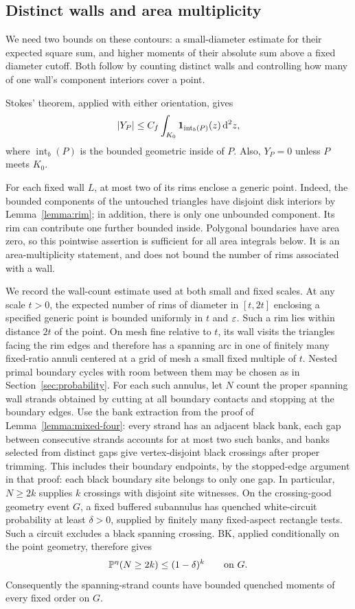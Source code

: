 \subsection{Distinct walls and area multiplicity}

We need two bounds on these contours: a small-diameter estimate for
their expected square sum, and higher moments of their absolute sum
above a fixed diameter cutoff. Both follow by counting distinct walls
and controlling how many of one wall's component interiors cover a point.

Stokes' theorem, applied with either orientation, gives
\begin{equation}
 |Y_P|\le C_f\int_{K_0}\mathbf 1_{\operatorname{int}_b(P)}(z)\,\mathrm d^2z,
 \label{energy:stokes}
\end{equation}
where $\operatorname{int}_b(P)$ is the bounded geometric inside of $P$.
Also, $Y_P=0$ unless $P$ meets $K_0$.

For each fixed wall $L$, at most two of its rims enclose a generic point.
Indeed, the bounded components of the untouched triangles have disjoint
disk interiors by Lemma~\ref{lemma:rim}; in addition, there is only one
unbounded component. Its rim can contribute one further bounded inside.
Polygonal boundaries have area zero, so this pointwise assertion is
sufficient for all area integrals below. It is an area-multiplicity
statement, and does not bound the number of rims associated with a wall.

We record the wall-count estimate used at both small and fixed scales.
At any scale $t>0$, the expected number of rims of diameter in $[t,2t]$
enclosing a specified generic point is bounded uniformly in $t$ and
$\varepsilon$. Such a rim lies within distance $2t$ of the point. On mesh fine
relative to $t$, its wall visits the triangles facing the rim edges and
therefore has a spanning arc in one of finitely many fixed-ratio annuli
centered at a grid of mesh a small fixed multiple of $t$. Nested primal
boundary cycles with room between them may be chosen as in
Section~\ref{sec:probability}. For each such annulus, let $N$ count the
proper spanning wall strands obtained by cutting at all boundary
contacts and stopping at the boundary edges. Use the bank extraction
from the proof of Lemma~\ref{lemma:mixed-four}: every strand has an
adjacent black bank, each gap between consecutive strands accounts for
at most two such banks, and banks selected from distinct gaps give
vertex-disjoint black crossings after proper trimming. This includes
their boundary endpoints, by the stopped-edge argument in that proof:
each black boundary site belongs to only one gap.
In particular, $N\ge2k$ supplies $k$ crossings with
disjoint site witnesses. On the crossing-good geometry event $G$, a
fixed buffered subannulus has quenched white-circuit probability at
least $\delta>0$, supplied by finitely many fixed-aspect rectangle tests.
Such a circuit excludes a black spanning crossing. BK, applied
conditionally on the point geometry, therefore gives
\[
            \mathbb P^{\eta}(N\ge2k)\le(1-\delta)^k\qquad\text{on }G.
\]
Consequently the spanning-strand counts have bounded quenched moments
of every fixed order on $G$.


